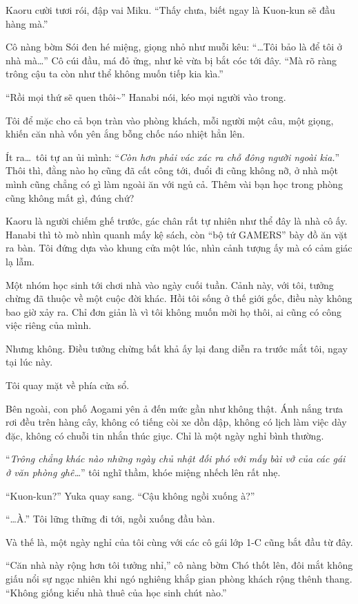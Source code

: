 \documentclass[../main.tex]{subfiles}
\begin{document}
Kaoru cười tươi rói, đập vai Miku. ``Thấy chưa, biết ngay là Kuon-kun sẽ đầu hàng mà.''

Cô nàng bờm Sói đen hé miệng, giọng nhỏ như muỗi kêu: ``\dots Tôi bảo là để tôi ở nhà mà\dots'' Cô cúi đầu, má đỏ ửng, như kẻ vừa bị bắt cóc tới đây. ``Mà rõ ràng trông cậu ta còn như thể không muốn tiếp kia kìa.''

``Rồi mọi thứ sẽ quen thôi\~{}'' Hanabi nói, kéo mọi người vào trong.

Tôi để mặc cho cả bọn tràn vào phòng khách, mỗi người một câu, một giọng, khiến căn nhà vốn yên ắng bỗng chốc náo nhiệt hẳn lên.

Ít ra\dots\ tôi tự an ủi mình: ``\textit{Còn hơn phải vác xác ra chỗ đông người ngoài kia.}'' Thôi thì, đằng nào họ cũng đã cất công tới, đuổi đi cũng không nỡ, ở nhà một mình cũng chẳng có gì làm ngoài ăn với ngủ cả. Thêm vài bạn học trong phòng cũng không mất gì, đúng chứ?

Kaoru là người chiếm ghế trước, gác chân rất tự nhiên như thể đây là nhà cô ấy. Hanabi thì tò mò nhìn quanh mấy kệ sách, còn ``bộ tứ GAMERS'' bày đồ ăn vặt ra bàn. Tôi đứng dựa vào khung cửa một lúc, nhìn cảnh tượng ấy mà có cảm giác lạ lẫm.

Một nhóm học sinh tới chơi nhà vào ngày cuối tuần. Cảnh này, với tôi, tưởng chừng đã thuộc về một cuộc đời khác. Hồi tôi sống ở thế giới gốc, điều này không bao giờ xảy ra. Chỉ đơn giản là vì tôi không muốn mời họ thôi, ai cũng có công việc riêng của mình.

Nhưng không. Điều tưởng chừng bất khả ấy lại đang diễn ra trước mắt tôi, ngay tại lúc này.

Tôi quay mặt về phía cửa sổ.

Bên ngoài, con phố Aogami yên ả đến mức gần như không thật. Ánh nắng trưa rơi đều trên hàng cây, không có tiếng còi xe dồn dập, không có lịch làm việc dày đặc, không có chuỗi tin nhắn thúc giục. Chỉ là một ngày nghỉ bình thường.

``\textit{Trông chẳng khác nào những ngày chủ nhật đối phó với mấy bài vở của các gái ở văn phòng ghê\dots}'' tôi nghĩ thầm, khóe miệng nhếch lên rất nhẹ.

``Kuon-kun?'' Yuka quay sang. ``Cậu không ngồi xuống à?''

``\dots À.'' Tôi lững thững đi tới, ngồi xuống đầu bàn.

Và thế là, một ngày nghỉ của tôi cùng với các cô gái lớp 1-C cũng bắt đầu từ đây.

\ct

``Căn nhà này rộng hơn tôi tưởng nhỉ,'' cô nàng bờm Chó thốt lên, đôi mắt không giấu nổi sự ngạc nhiên khi ngó nghiêng khắp gian phòng khách rộng thênh thang. ``Không giống kiểu nhà thuê của học sinh chút nào.''
\end{document}

